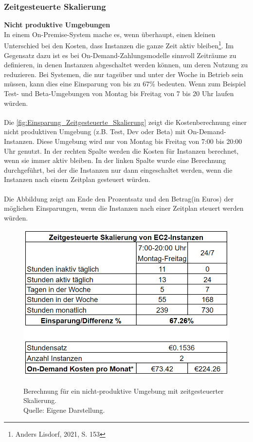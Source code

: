 \subsubsection{Zeitgesteuerte Skalierung}\label{ssec:ZeitgesteuerteScal}
\textbf{Nicht produktive Umgebungen}\\
In einem On-Premise-System mache es, wenn überhaupt, einen kleinen Unterschied bei den Kosten, dass Instanzen die ganze Zeit aktiv bleiben\footnote{Anders Lisdorf, 2021, S. 153\cite{CCB}}. %
Im Gegensatz dazu ist es bei On-Demand-Zahlungsmodelle sinnvoll Zeiträume zu definieren, in denen Instanzen abgeschaltet werden können, um deren Nutzung zu reduzieren. Bei Systemen, die nur tagsüber und unter der Woche in Betrieb sein müssen, kann dies eine Einsparung von bis zu 67\% bedeuten. Wenn zum Beispiel Test- und Beta-Umgebungen von Montag bis Freitag von 7 bis 20 Uhr laufen würden. 
\\\\
Die \autoref{fig:Einsparung_Zeitgesteuerte_Skalierung} zeigt die Kostenberechnung einer nicht produktiven Umgebung (z.B. Test, Dev oder Beta) mit On-Demand-Instanzen. Diese Umgebung wird nur von Montag bis Freitag von 7:00 bis 20:00 Uhr genutzt. In der rechten Spalte werden die Kosten für Instanzen berechnet, wenn sie immer aktiv bleiben. In der linken Spalte wurde eine Berechnung durchgeführt, bei der die Instanzen nur dann eingeschaltet werden, wenn die Instanzen nach einem Zeitplan gesteuert würden.
\\\\
Die Abbildung zeigt am Ende den Prozentsatz und den Betrag(in Euros) der möglichen Einsparungen, wenn die Instanzen nach einer Zeitplan steuert werden würden.
\begin{figure}[h]
  \centering
  \includegraphics[scale=0.6]{sources/Einsparung_Zeitgesteuerte_Skalierung}
  \caption[Berechnung für ein nicht produktives Umgebung mit Zeitgesteuerte Skalierung]{}
  \label{fig:Einsparung_Zeitgesteuerte_Skalierung} 
  Berechnung für ein nicht-produktive Umgebung mit zeitgesteuerter Skalierung. \\
  Quelle: Eigene Darstellung.
\end{figure}
